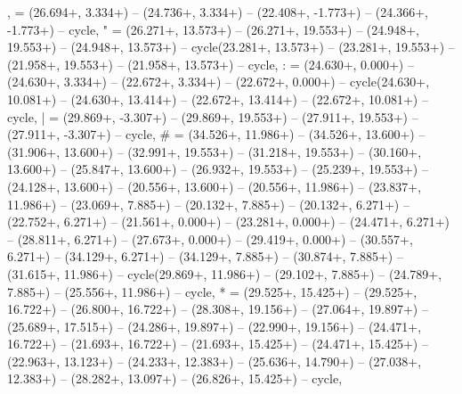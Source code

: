 {,} = {(26.694+\ctpXshift, 3.334+\ctpYshift) -- (24.736+\ctpXshift, 3.334+\ctpYshift) -- (22.408+\ctpXshift, -1.773+\ctpYshift) -- (24.366+\ctpXshift, -1.773+\ctpYshift) -- cycle},
{"} = {(26.271+\ctpXshift, 13.573+\ctpYshift) -- (26.271+\ctpXshift, 19.553+\ctpYshift) -- (24.948+\ctpXshift, 19.553+\ctpYshift) -- (24.948+\ctpXshift, 13.573+\ctpYshift) -- cycle(23.281+\ctpXshift, 13.573+\ctpYshift) -- (23.281+\ctpXshift, 19.553+\ctpYshift) -- (21.958+\ctpXshift, 19.553+\ctpYshift) -- (21.958+\ctpXshift, 13.573+\ctpYshift) -- cycle},
{:} = {(24.630+\ctpXshift, 0.000+\ctpYshift) -- (24.630+\ctpXshift, 3.334+\ctpYshift) -- (22.672+\ctpXshift, 3.334+\ctpYshift) -- (22.672+\ctpXshift, 0.000+\ctpYshift) -- cycle(24.630+\ctpXshift, 10.081+\ctpYshift) -- (24.630+\ctpXshift, 13.414+\ctpYshift) -- (22.672+\ctpXshift, 13.414+\ctpYshift) -- (22.672+\ctpXshift, 10.081+\ctpYshift) -- cycle},
{|} = {(29.869+\ctpXshift, -3.307+\ctpYshift) -- (29.869+\ctpXshift, 19.553+\ctpYshift) -- (27.911+\ctpXshift, 19.553+\ctpYshift) -- (27.911+\ctpXshift, -3.307+\ctpYshift) -- cycle},
{\#} = {(34.526+\ctpXshift, 11.986+\ctpYshift) -- (34.526+\ctpXshift, 13.600+\ctpYshift) -- (31.906+\ctpXshift, 13.600+\ctpYshift) -- (32.991+\ctpXshift, 19.553+\ctpYshift) -- (31.218+\ctpXshift, 19.553+\ctpYshift) -- (30.160+\ctpXshift, 13.600+\ctpYshift) -- (25.847+\ctpXshift, 13.600+\ctpYshift) -- (26.932+\ctpXshift, 19.553+\ctpYshift) -- (25.239+\ctpXshift, 19.553+\ctpYshift) -- (24.128+\ctpXshift, 13.600+\ctpYshift) -- (20.556+\ctpXshift, 13.600+\ctpYshift) -- (20.556+\ctpXshift, 11.986+\ctpYshift) -- (23.837+\ctpXshift, 11.986+\ctpYshift) -- (23.069+\ctpXshift, 7.885+\ctpYshift) -- (20.132+\ctpXshift, 7.885+\ctpYshift) -- (20.132+\ctpXshift, 6.271+\ctpYshift) -- (22.752+\ctpXshift, 6.271+\ctpYshift) -- (21.561+\ctpXshift, 0.000+\ctpYshift) -- (23.281+\ctpXshift, 0.000+\ctpYshift) -- (24.471+\ctpXshift, 6.271+\ctpYshift) -- (28.811+\ctpXshift, 6.271+\ctpYshift) -- (27.673+\ctpXshift, 0.000+\ctpYshift) -- (29.419+\ctpXshift, 0.000+\ctpYshift) -- (30.557+\ctpXshift, 6.271+\ctpYshift) -- (34.129+\ctpXshift, 6.271+\ctpYshift) -- (34.129+\ctpXshift, 7.885+\ctpYshift) -- (30.874+\ctpXshift, 7.885+\ctpYshift) -- (31.615+\ctpXshift, 11.986+\ctpYshift) -- cycle(29.869+\ctpXshift, 11.986+\ctpYshift) -- (29.102+\ctpXshift, 7.885+\ctpYshift) -- (24.789+\ctpXshift, 7.885+\ctpYshift) -- (25.556+\ctpXshift, 11.986+\ctpYshift) -- cycle},
{*} = {(29.525+\ctpXshift, 15.425+\ctpYshift) -- (29.525+\ctpXshift, 16.722+\ctpYshift) -- (26.800+\ctpXshift, 16.722+\ctpYshift) -- (28.308+\ctpXshift, 19.156+\ctpYshift) -- (27.064+\ctpXshift, 19.897+\ctpYshift) -- (25.689+\ctpXshift, 17.515+\ctpYshift) -- (24.286+\ctpXshift, 19.897+\ctpYshift) -- (22.990+\ctpXshift, 19.156+\ctpYshift) -- (24.471+\ctpXshift, 16.722+\ctpYshift) -- (21.693+\ctpXshift, 16.722+\ctpYshift) -- (21.693+\ctpXshift, 15.425+\ctpYshift) -- (24.471+\ctpXshift, 15.425+\ctpYshift) -- (22.963+\ctpXshift, 13.123+\ctpYshift) -- (24.233+\ctpXshift, 12.383+\ctpYshift) -- (25.636+\ctpXshift, 14.790+\ctpYshift) -- (27.038+\ctpXshift, 12.383+\ctpYshift) -- (28.282+\ctpXshift, 13.097+\ctpYshift) -- (26.826+\ctpXshift, 15.425+\ctpYshift) -- cycle},
